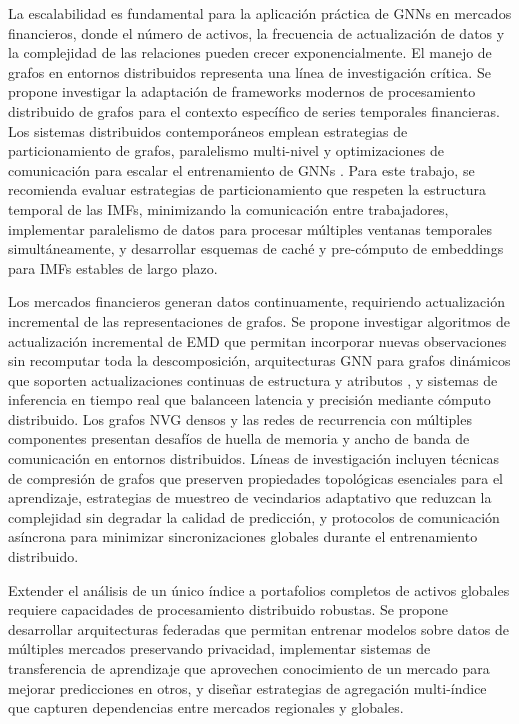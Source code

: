 \documentclass[11pt,a4paper]{article}
\begin{document}
La escalabilidad es fundamental para la aplicación práctica de GNNs en mercados financieros, donde el número de activos, la frecuencia de actualización de datos y la complejidad de las relaciones pueden crecer exponencialmente. El manejo de grafos en entornos distribuidos representa una línea de investigación crítica. Se propone investigar la adaptación de frameworks modernos de procesamiento distribuido de grafos para el contexto específico de series temporales financieras. Los sistemas distribuidos contemporáneos emplean estrategias de particionamiento de grafos, paralelismo multi-nivel y optimizaciones de comunicación para escalar el entrenamiento de GNNs \citep{xu2025capturing}. Para este trabajo, se recomienda evaluar estrategias de particionamiento que respeten la estructura temporal de las IMFs, minimizando la comunicación entre trabajadores, implementar paralelismo de datos para procesar múltiples ventanas temporales simultáneamente, y desarrollar esquemas de caché y pre-cómputo de embeddings para IMFs estables de largo plazo.

Los mercados financieros generan datos continuamente, requiriendo actualización incremental de las representaciones de grafos. Se propone investigar algoritmos de actualización incremental de EMD que permitan incorporar nuevas observaciones sin recomputar toda la descomposición, arquitecturas GNN para grafos dinámicos que soporten actualizaciones continuas de estructura y atributos \citep{gravina2023scalable, liu2023decoupled}, y sistemas de inferencia en tiempo real que balanceen latencia y precisión mediante cómputo distribuido. Los grafos NVG densos y las redes de recurrencia con múltiples componentes presentan desafíos de huella de memoria y ancho de banda de comunicación en entornos distribuidos. Líneas de investigación incluyen técnicas de compresión de grafos que preserven propiedades topológicas esenciales para el aprendizaje, estrategias de muestreo de vecindarios adaptativo que reduzcan la complejidad sin degradar la calidad de predicción, y protocolos de comunicación asíncrona para minimizar sincronizaciones globales durante el entrenamiento distribuido.

Extender el análisis de un único índice a portafolios completos de activos globales requiere capacidades de procesamiento distribuido robustas. Se propone desarrollar arquitecturas federadas que permitan entrenar modelos sobre datos de múltiples mercados preservando privacidad, implementar sistemas de transferencia de aprendizaje que aprovechen conocimiento de un mercado para mejorar predicciones en otros, y diseñar estrategias de agregación multi-índice que capturen dependencias entre mercados regionales y globales.
\end{document}
